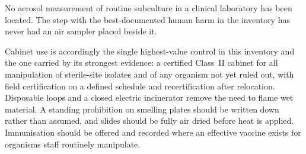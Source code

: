 No aerosol measurement of routine subculture in a clinical laboratory has been
located. The step with the best-documented human harm in the inventory has
never had an air sampler placed beside it.

Cabinet use is accordingly the single highest-value control in this inventory
and the one carried by its strongest evidence: a certified Class~II cabinet for
all manipulation of sterile-site isolates and of any organism not yet ruled
out, with field certification on a defined schedule and recertification after
relocation. Disposable loops and a closed electric incinerator remove the need
to flame wet material. A standing prohibition on smelling plates should be
written down rather than assumed, and slides should be fully air dried before
heat is applied. Immunisation should be offered and recorded where an effective
vaccine exists for organisms staff routinely manipulate.

